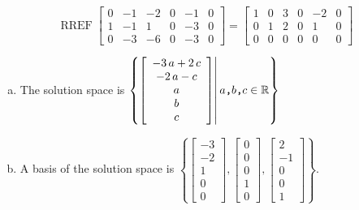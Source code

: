 \begin{exerciseAnswer} 


\[\operatorname{RREF} \left[\begin{array}{ccccc|c}
0 & -1 & -2 & 0 & -1 & 0 \\
1 & -1 & 1 & 0 & -3 & 0 \\
0 & -3 & -6 & 0 & -3 & 0
\end{array}\right] = \left[\begin{array}{ccccc|c}
1 & 0 & 3 & 0 & -2 & 0 \\
0 & 1 & 2 & 0 & 1 & 0 \\
0 & 0 & 0 & 0 & 0 & 0
\end{array}\right] \]


\begin{enumerate}[(a)]
\item The solution space is \( \left\{ \left[\begin{array}{c}
-3 \, a + 2 \, c \\
-2 \, a - c \\
a \\
b \\
c
\end{array}\right] \middle|\,a\text{\texttt{,}}b\text{\texttt{,}}c\in\mathbb{R}\right\} \)
\item A basis of the solution space is \( \left\{ \left[\begin{array}{c}
-3 \\
-2 \\
1 \\
0 \\
0
\end{array}\right] , \left[\begin{array}{c}
0 \\
0 \\
0 \\
1 \\
0
\end{array}\right] , \left[\begin{array}{c}
2 \\
-1 \\
0 \\
0 \\
1
\end{array}\right] \right\} \).
\end{enumerate}
    
\end{exerciseAnswer}
    
